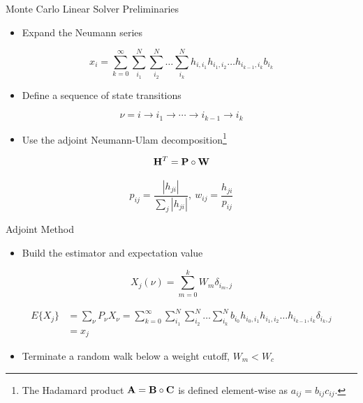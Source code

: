 \documentclass{beamer}
\begin{document}
\begin{frame}{Monte Carlo Linear Solver Preliminaries}

  \begin{itemize}
  \item Expand the Neumann series
  \end{itemize}

  \[
  x_i = \sum_{k=0}^{\infty}\sum_{i_1}^{N}\sum_{i_2}^{N}\ldots
  \sum_{i_k}^{N}h_{i,i_1}h_{i_1,i_2}\ldots h_{i_{k-1},i_k}b_{i_k}
  \]

  \begin{itemize}
  \item Define a sequence of state transitions
  \end{itemize}
  
  \[
  \nu = i \rightarrow i_1 \rightarrow \cdots \rightarrow i_{k-1}
  \rightarrow i_{k}
  \]

  \begin{itemize}
  \item Use the adjoint Neumann-Ulam decomposition\footnote{The
    Hadamard product $\mathbf{A} = \mathbf{B} \circ \mathbf{C}$ is defined
    element-wise as $a_{ij} = b_{ij} c_{ij}$.}
  \end{itemize}

  \[
  \mathbf{H}^{T} = \mathbf{P} \circ \mathbf{W}
  \]

  \[
  p_{ij} = \frac{|h_{ji}|}{\sum_j |h_{ji}|},\ w_{ij} =
  \frac{h_{ji}}{p_{ij}}
  \]

\end{frame}

\begin{frame}{Adjoint Method}

  \medskip
  \begin{itemize}
  \item Build the estimator and expectation value
  \end{itemize}

  \[
  X_j(\nu) = \sum_{m=0}^k W_{m} \delta_{i_m,j}
  \]

  \[
  \begin{split}
    E\{X_j\} &= \sum_{\nu}P_{\nu}X_{\nu} =
    \sum_{k=0}^{\infty}\sum_{i_1}^{N}\sum_{i_2}^{N}\ldots
    \sum_{i_k}^{N} b_{i_0} h_{i_0,i_1}h_{i_1,i_2}\ldots
    h_{i_{k-1},i_k} \delta_{i_k,j} \\ &= x_{j}
  \end{split}
  \]

  \medskip
  \begin{itemize}
  \item Terminate a random walk below a weight cutoff, $W_m < W_c$
  \end{itemize}

\end{frame}
\end{document}
